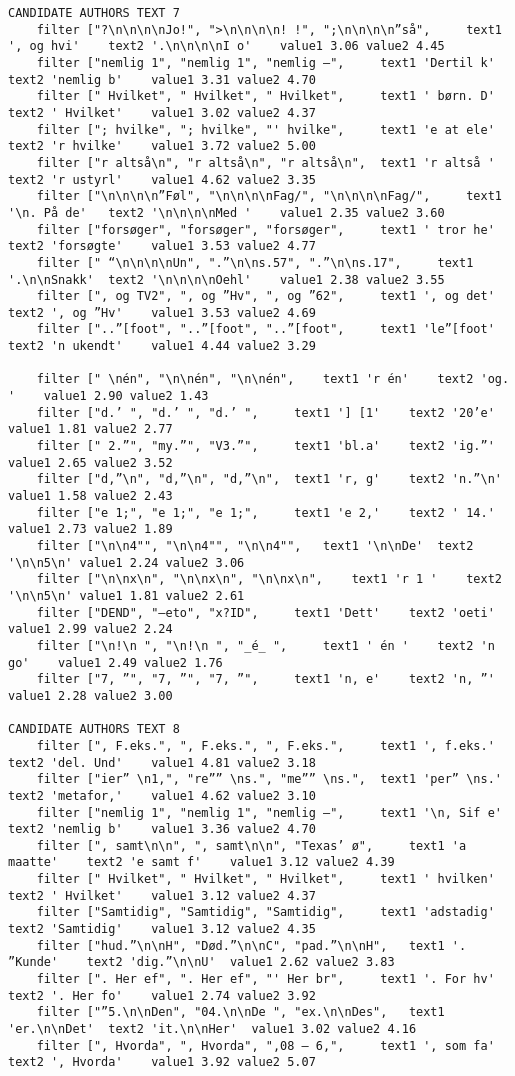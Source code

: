 {\begin{verbatim}
CANDIDATE AUTHORS TEXT 7
	filter ["?\n\n\n\nJo!", ">\n\n\n\n! !", ";\n\n\n\n”så", 	text1 ', og hvi'	text2 '.\n\n\n\nI o'	value1 3.06	value2 4.45
	filter ["nemlig 1", "nemlig 1", "nemlig –", 	text1 'Dertil k'	text2 'nemlig b'	value1 3.31	value2 4.70
	filter [" Hvilket", " Hvilket", " Hvilket", 	text1 ' børn. D'	text2 ' Hvilket'	value1 3.02	value2 4.37
	filter ["; hvilke", "; hvilke", "' hvilke", 	text1 'e at ele'	text2 'r hvilke'	value1 3.72	value2 5.00
	filter ["r altså\n", "r altså\n", "r altså\n", 	text1 'r altså '	text2 'r ustyrl'	value1 4.62	value2 3.35
	filter ["\n\n\n\n”Føl", "\n\n\n\nFag/", "\n\n\n\nFag/", 	text1 '\n. På de'	text2 '\n\n\n\nMed '	value1 2.35	value2 3.60
	filter ["forsøger", "forsøger", "forsøger", 	text1 ' tror he'	text2 'forsøgte'	value1 3.53	value2 4.77
	filter [" “\n\n\n\nUn", ".”\n\ns.57", ".”\n\ns.17", 	text1 '.\n\nSnakk'	text2 '\n\n\n\nOehl'	value1 2.38	value2 3.55
	filter [", og TV2", ", og ”Hv", ", og ”62", 	text1 ', og det'	text2 ', og ”Hv'	value1 3.53	value2 4.69
	filter ["..”[foot", "..”[foot", "..”[foot", 	text1 'le”[foot'	text2 'n ukendt'	value1 4.44	value2 3.29

	filter [" \nén", "\n\nén", "\n\nén", 	text1 'r én'	text2 'og. '	value1 2.90	value2 1.43
	filter ["d.’ ", "d.’ ", "d.’ ", 	text1 '] [1'	text2 '20’e'	value1 1.81	value2 2.77
	filter [" 2.”", "my.”", "V3.”", 	text1 'bl.a'	text2 'ig.”'	value1 2.65	value2 3.52
	filter ["d,”\n", "d,”\n", "d,”\n", 	text1 'r, g'	text2 'n.”\n'	value1 1.58	value2 2.43
	filter ["e 1;", "e 1;", "e 1;", 	text1 'e 2,'	text2 ' 14.'	value1 2.73	value2 1.89
	filter ["\n\n4"", "\n\n4"", "\n\n4"", 	text1 '\n\nDe'	text2 '\n\n5\n'	value1 2.24	value2 3.06
	filter ["\n\nx\n", "\n\nx\n", "\n\nx\n", 	text1 'r 1 '	text2 '\n\n5\n'	value1 1.81	value2 2.61
	filter ["DEND", "–eto", "x?ID", 	text1 'Dett'	text2 'oeti'	value1 2.99	value2 2.24
	filter ["\n!\n ", "\n!\n ", "_é_ ", 	text1 ' én '	text2 'n go'	value1 2.49	value2 1.76
	filter ["7, ”", "7, ”", "7, ”", 	text1 'n, e'	text2 'n, ”'	value1 2.28	value2 3.00

CANDIDATE AUTHORS TEXT 8
	filter [", F.eks.", ", F.eks.", ", F.eks.", 	text1 ', f.eks.'	text2 'del. Und'	value1 4.81	value2 3.18
	filter ["ier” \n1,", "re”” \ns.", "me”” \ns.", 	text1 'per” \ns.'	text2 'metafor,'	value1 4.62	value2 3.10
	filter ["nemlig 1", "nemlig 1", "nemlig –", 	text1 '\n, Sif e'	text2 'nemlig b'	value1 3.36	value2 4.70
	filter [", samt\n\n", ", samt\n\n", "Texas’ ø", 	text1 'a maatte'	text2 'e samt f'	value1 3.12	value2 4.39
	filter [" Hvilket", " Hvilket", " Hvilket", 	text1 ' hvilken'	text2 ' Hvilket'	value1 3.12	value2 4.37
	filter ["Samtidig", "Samtidig", "Samtidig", 	text1 'adstadig'	text2 'Samtidig'	value1 3.12	value2 4.35
	filter ["hud.”\n\nH", "Død.”\n\nC", "pad.”\n\nH", 	text1 '. ”Kunde'	text2 'dig.”\n\nU'	value1 2.62	value2 3.83
	filter [". Her ef", ". Her ef", "' Her br", 	text1 '. For hv'	text2 '. Her fo'	value1 2.74	value2 3.92
	filter ["”5.\n\nDen", "04.\n\nDe ", "ex.\n\nDes", 	text1 'er.\n\nDet'	text2 'it.\n\nHer'	value1 3.02	value2 4.16
	filter [", Hvorda", ", Hvorda", ",08 – 6,", 	text1 ', som fa'	text2 ', Hvorda'	value1 3.92	value2 5.07


\end{verbatim}}
